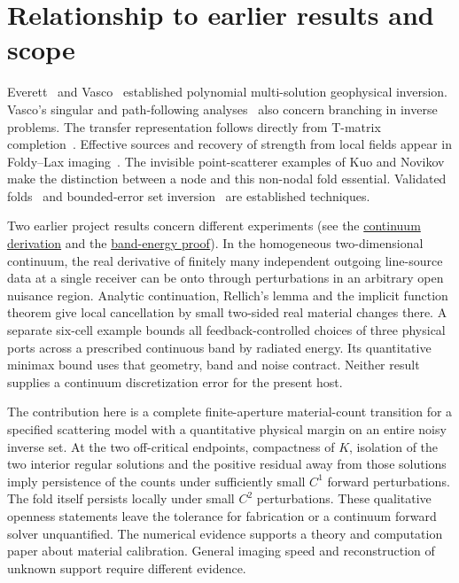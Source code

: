 \documentclass[10pt]{article}
\begin{document}
\section{Relationship to earlier results and scope}
Everett~\cite{everett96,everett26} and Vasco~\cite{vasco00} established polynomial multi-solution geophysical inversion. Vasco's singular and path-following analyses~\cite{vasco93,vasco94} also concern branching in inverse problems. The transfer representation follows directly from T-matrix completion~\cite{dctmc}. Effective sources and recovery of strength from local fields appear in Foldy--Lax imaging~\cite{chai}. The invisible point-scatterer examples of Kuo and Novikov~\cite{kuo} make the distinction between a node and this non-nodal fold essential. Validated folds~\cite{lessard} and bounded-error set inversion~\cite{sivia} are established techniques.

Two earlier project results concern different experiments (see the \href{https://github.com/migodam/b1-probabilistic-maxwell-imaging/blob/main/research/research_z_alg_r7/THEORY_DERIVATIONS.md}{continuum derivation} and the \href{https://github.com/migodam/b1-probabilistic-maxwell-imaging/blob/main/research/research_z_alg_r14/MATHEMATICAL_THEORY.md}{band-energy proof}). In the homogeneous two-dimensional continuum, the real derivative of finitely many independent outgoing line-source data at a single receiver can be onto through perturbations in an arbitrary open nuisance region. Analytic continuation, Rellich's lemma and the implicit function theorem give local cancellation by small two-sided real material changes there. A separate six-cell example bounds all feedback-controlled choices of three physical ports across a prescribed continuous band by radiated energy. Its quantitative minimax bound uses that geometry, band and noise contract. Neither result supplies a continuum discretization error for the present host.

The contribution here is a complete finite-aperture material-count transition for a specified scattering model with a quantitative physical margin on an entire noisy inverse set. At the two off-critical endpoints, compactness of $K$, isolation of the two interior regular solutions and the positive residual away from those solutions imply persistence of the counts under sufficiently small $C^1$ forward perturbations. The fold itself persists locally under small $C^2$ perturbations. These qualitative openness statements leave the tolerance for fabrication or a continuum forward solver unquantified. The numerical evidence supports a theory and computation paper about material calibration. General imaging speed and reconstruction of unknown support require different evidence.
\end{document}
